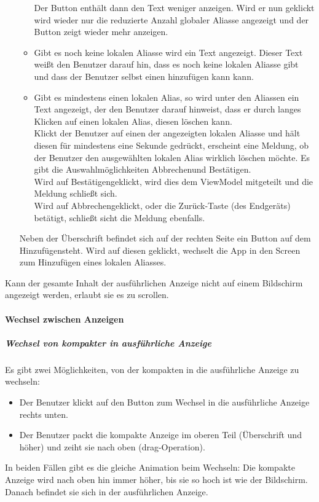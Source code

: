 \begin{itemize}
\begin{itemize}
        Der Button enthält dann den Text \dq weniger anzeigen\dq . Wird er nun geklickt wird wieder nur die 
        reduzierte Anzahl globaler Aliasse angezeigt und der Button zeigt wieder \dq mehr anzeigen\dq.
        \item Gibt es noch keine lokalen Aliasse wird ein Text angezeigt. Dieser Text weißt den Benutzer 
        darauf hin, dass es noch keine lokalen Aliasse gibt und dass der Benutzer selbst einen hinzufügen kann kann.
        \item Gibt es mindestens einen lokalen Alias, so wird unter den Aliassen ein Text angezeigt, 
        der den Benutzer darauf hinweist, dass er durch langes Klicken auf einen lokalen Alias, diesen 
        löschen kann.\\
        Klickt der Benutzer auf einen der angezeigten lokalen Aliasse und hält diesen für mindestens eine 
        Sekunde gedrückt, erscheint eine Meldung, ob der Benutzer den ausgewählten lokalen Alias wirklich 
        löschen möchte. Es gibt die Auswahlmöglichkeiten \dq Abbrechen\dq  und \dq Bestätigen\dq .\\ 
        Wird auf \dq Bestätigen\dq  geklickt, wird dies dem ViewModel mitgeteilt und die Meldung schließt sich.\\
        Wird auf \dq Abbrechen\dq  geklickt, oder die Zurück-Taste (des Endgeräts) betätigt, schließt sicht die Meldung ebenfalls.
    \end{itemize}
    Neben der Überschrift befindet sich auf der rechten Seite ein Button auf dem \dq Hinzufügen\dq  steht. 
    Wird auf diesen geklickt, wechselt die App in den Screen zum Hinzufügen eines lokalen Aliasses.
\end{itemize}
Kann der gesamte Inhalt der ausführlichen Anzeige nicht auf einem Bildschirm angezeigt werden, erlaubt sie es zu scrollen.

\paragraph*{Wechsel zwischen Anzeigen}
\subparagraph*{Wechsel von kompakter in ausführliche Anzeige}
Es gibt zwei Möglichkeiten, von der kompakten in die ausführliche Anzeige zu wechseln:
\begin{itemize}
    \item Der Benutzer klickt auf den Button zum Wechsel in die ausführliche Anzeige rechts unten.
    \item Der Benutzer packt die kompakte Anzeige im oberen Teil (Überschrift und höher) und zeiht sie nach oben (drag-Operation).
\end{itemize}
In beiden Fällen gibt es die gleiche Animation beim Wechseln: Die kompakte Anzeige wird nach oben hin immer 
höher, bis sie so hoch ist wie der Bildschirm. Danach befindet sie sich in der ausführlichen Anzeige.

